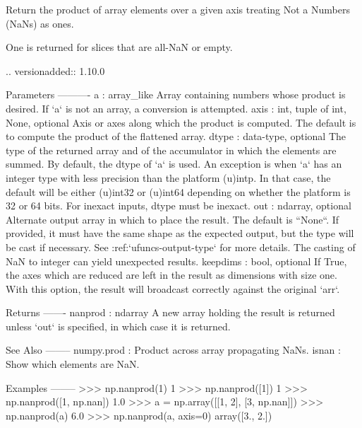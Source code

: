 \begin{DoxyVerb}Return the product of array elements over a given axis treating Not a
Numbers (NaNs) as ones.

One is returned for slices that are all-NaN or empty.

.. versionadded:: 1.10.0

Parameters
----------
a : array_like
    Array containing numbers whose product is desired. If `a` is not an
    array, a conversion is attempted.
axis : {int, tuple of int, None}, optional
    Axis or axes along which the product is computed. The default is to compute
    the product of the flattened array.
dtype : data-type, optional
    The type of the returned array and of the accumulator in which the
    elements are summed.  By default, the dtype of `a` is used.  An
    exception is when `a` has an integer type with less precision than
    the platform (u)intp. In that case, the default will be either
    (u)int32 or (u)int64 depending on whether the platform is 32 or 64
    bits. For inexact inputs, dtype must be inexact.
out : ndarray, optional
    Alternate output array in which to place the result.  The default
    is ``None``. If provided, it must have the same shape as the
    expected output, but the type will be cast if necessary. See
    :ref:`ufuncs-output-type` for more details. The casting of NaN to integer
    can yield unexpected results.
keepdims : bool, optional
    If True, the axes which are reduced are left in the result as
    dimensions with size one. With this option, the result will
    broadcast correctly against the original `arr`.

Returns
-------
nanprod : ndarray
    A new array holding the result is returned unless `out` is
    specified, in which case it is returned.

See Also
--------
numpy.prod : Product across array propagating NaNs.
isnan : Show which elements are NaN.

Examples
--------
>>> np.nanprod(1)
1
>>> np.nanprod([1])
1
>>> np.nanprod([1, np.nan])
1.0
>>> a = np.array([[1, 2], [3, np.nan]])
>>> np.nanprod(a)
6.0
>>> np.nanprod(a, axis=0)
array([3., 2.])\end{DoxyVerb}
 \mbox{\label{namespacenumpy_1_1lib_1_1nanfunctions_a5eb8de27a8087256d8205db0e4151bd4}} 
